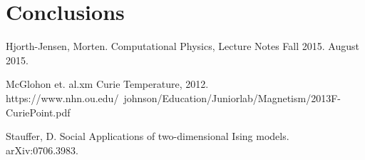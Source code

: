 \documentclass[%
oneside,                 %
final,                   %
10pt]{article}
\begin{document}
\section{Conclusions}

\begin{thebibliography}{9}

Hjorth-Jensen, Morten. 
Computational Physics, Lecture Notes Fall 2015. 
August 2015.

McGlohon et. al.xm
Curie Temperature, 2012.
https://www.nhn.ou.edu/~johnson/Education/Juniorlab/Magnetism/2013F-CuriePoint.pdf

Stauffer, D.
Social Applications of two-dimensional Ising models.
arXiv:0706.3983.

\end{thebibliography}



\end{document}
